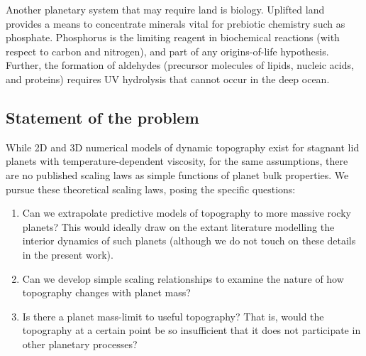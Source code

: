 Another planetary system that may require land is biology. Uplifted land provides a means to concentrate minerals vital for prebiotic chemistry such as phosphate. Phosphorus is the limiting reagent in biochemical reactions (with respect to carbon and nitrogen), and part of any origins-of-life hypothesis. Further, the formation of aldehydes (precursor molecules of lipids, nucleic acids, and proteins) requires UV hydrolysis that cannot occur in the deep ocean.

\subsection{Statement of the problem}

While 2D and 3D numerical models of dynamic topography exist for stagnant lid planets with temperature-dependent viscosity, for the same assumptions, there are no published scaling laws as simple functions of planet bulk properties. We pursue these theoretical scaling laws, posing the specific questions:

\begin{enumerate}
\item Can we extrapolate predictive models of topography to more massive rocky planets? This would ideally draw on the extant literature modelling the interior dynamics of such planets (although we do not touch on these details in the present work).
\item Can we develop simple scaling relationships to examine the nature of how topography changes with planet mass?
\item Is there a planet mass-limit to useful topography? That is, would the topography at a certain point be so insufficient that it does not participate in other planetary processes?
\end{enumerate}





